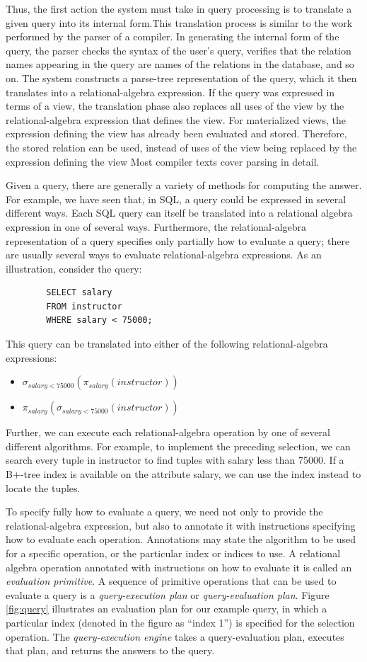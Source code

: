 \documentclass{vldb}
\newcommand{\bi}{\begin{itemize}}
\newcommand{\ei}{\end{itemize}}
\newcommand{\ii}{\item}
\newcommand{\select}{\sigma}
\newcommand{\project}{\pi}
\begin{document}
Thus, the first action the system must take in query processing is to translate
a given query into its internal form.This translation process is similar to the work
performed by the parser of a compiler. In generating the internal form of the
query, the parser checks the syntax of the user’s query, verifies that the relation
names appearing in the query are names of the relations in the database, and
so on. The system constructs a parse-tree representation of the query, which it
then translates into a relational-algebra expression. If the query was expressed
in terms of a view, the translation phase also replaces all uses of the view by the
relational-algebra expression that defines the view. 
For materialized views, the expression defining the view has already been evaluated and stored. 
Therefore, the stored relation can be used, instead of uses of the view being replaced by the expression defining the view
Most compiler texts cover
parsing in detail.



Given a query, there are generally a variety of methods for computing the
answer. For example, we have seen that, in SQL, a query could be expressed in
several different ways. Each SQL query can itself be translated into a relational algebra
expression in one of several ways. Furthermore, the relational-algebra
representation of a query specifies only partially how to evaluate a query; there are
usually several ways to evaluate relational-algebra expressions. As an illustration,
consider the query:

\begin{lstlisting}
		SELECT salary
		FROM instructor
		WHERE salary < 75000;
\end{lstlisting}
This query can be translated into either of the following relational-algebra expressions:
\bi
\ii $\select_{salary<75000}(\project_{salary}(instructor))$
\ii $\project_{salary}(\select_{salary<75000}(instructor))$
\ei

Further, we can execute each relational-algebra operation by one of several different algorithms. For example, to implement the preceding selection, we can search every tuple in instructor to find tuples with salary less than 75000. If a B+-tree index is available on the attribute salary, we can use the index instead to locate the tuples.

 To specify fully how to evaluate a query, we need not only to provide the relational-algebra expression, but also to annotate it with instructions specifying how to evaluate each operation. 
Annotations may state the algorithm to be used for a specific operation, or the particular index or indices to use. A relational algebra
operation annotated with instructions on how to evaluate it is called an \textit{evaluation primitive}. 
A sequence of primitive operations that can be used to evaluate a query is a \textit{query-execution plan} or \textit{query-evaluation plan}. 
Figure \ref{fig:query} illustrates an evaluation plan for our example query, in which a particular index
(denoted in the figure as “index 1”) is specified for the selection operation. The
\textit{query-execution engine} takes a query-evaluation plan, executes that plan, and
returns the answers to the query.
\end{document}
